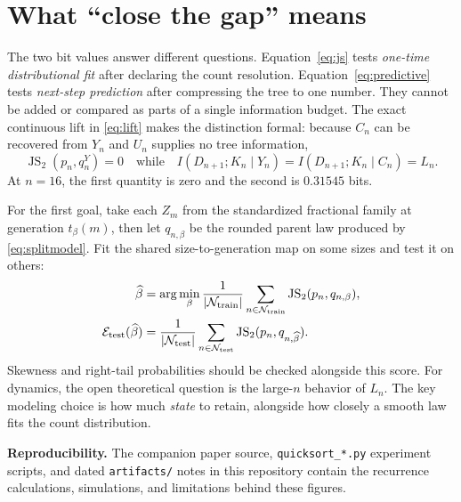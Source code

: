 \documentclass[10pt]{article}
\begin{document}
\section*{What ``close the gap'' means}
The two bit values answer different questions. Equation~\eqref{eq:js} tests
\emph{one-time distributional fit} after declaring the count resolution.
Equation~\eqref{eq:predictive} tests \emph{next-step prediction} after
compressing the tree to one number. They cannot be added or compared as parts
of a single information budget. The exact continuous lift in
\eqref{eq:lift} makes the distinction formal: because $C_n$ can be recovered
from $Y_n$ and $U_n$ supplies no tree information,
\begin{equation}
 \operatorname{JS}_2(p_n,q^Y_n)=0
 \quad\text{while}\quad
 I(D_{n+1};K_n\mid Y_n)=I(D_{n+1};K_n\mid C_n)=L_n.
 \label{eq:separation}
\end{equation}
At $n=16$, the first quantity is zero and the second is $0.31545$ bits.

For the first goal, take each $Z_m$ from the standardized fractional family
at generation $t_\beta(m)$, then let $q_{n,\beta}$ be the rounded parent law
produced by \eqref{eq:splitmodel}. Fit the shared size-to-generation map on
some sizes and test it on others:
\begin{align}
 \widehat\beta
 &=\arg\min_\beta \frac{1}{|\mathcal N_{\rm train}|}
   \sum_{n\in\mathcal N_{\rm train}}
   \operatorname{JS}_2(p_n,q_{n,\beta}), \nonumber\\
 \mathcal E_{\rm test}(\widehat\beta)
 &=\frac{1}{|\mathcal N_{\rm test}|}
   \sum_{n\in\mathcal N_{\rm test}}
   \operatorname{JS}_2(p_n,q_{n,\widehat\beta}).
 \label{eq:heldout}
\end{align}
Skewness and right-tail probabilities should be checked alongside this score.
For dynamics, the open theoretical question is the large-$n$ behavior of
$L_n$. The key modeling choice is how much \emph{state} to retain, alongside
how closely a smooth law fits the count distribution.

\vfill
{\footnotesize\textbf{Reproducibility.} The companion paper source,
\texttt{quicksort\_*.py} experiment scripts, and dated \texttt{artifacts/}
notes in this repository contain the recurrence calculations, simulations,
and limitations behind these figures.}
\end{document}
